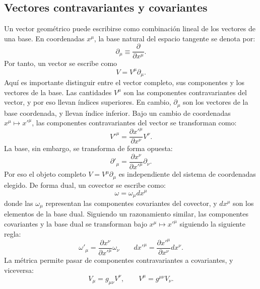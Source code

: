 \documentclass[a4paper,11pt]{book} %
\begin{document}
\subsection{Vectores contravariantes y covariantes}
\noindent
Un vector geométrico puede escribirse como combinación lineal de los vectores de una base. En coordenadas \(x^\mu\), la base natural del espacio tangente se denota por:
\begin{equation}
    \partial_\mu \equiv \frac{\partial}{\partial x^\mu}.
\end{equation}
Por tanto, un vector se escribe como
\begin{equation}
    V = V^\mu \partial_\mu.
\end{equation}
Aquí es importante distinguir entre el vector completo, sus componentes y los
vectores de la base. Las cantidades $V^\mu$ son las componentes contravariantes del vector, y por eso llevan índices superiores. En cambio, $\partial_\mu$ son los vectores de la base coordenada, y llevan índice inferior.
\medskip\newline
Bajo un cambio de coordenadas \(x^\mu \mapsto x'^\mu\), las componentes
contravariantes del vector se transforman como:
\begin{equation}
    V'^\mu
    =
    \frac{\partial x'^\mu}{\partial x^\nu} V^\nu.
\end{equation}
La base, sin embargo, se transforma de forma opuesta:
\begin{equation}
    \partial'_\mu
    =
    \frac{\partial x^\nu}{\partial x'^\mu}\partial_\nu.
\end{equation}
Por eso el objeto completo $V = V^\mu \partial_\mu$
es independiente del sistema de coordenadas elegido.
\medskip\newline
De forma dual, un covector se escribe como: $$\omega = \omega_\mu dx^\mu$$
donde las $\omega_\mu$ representan las componentes covariantes del covector, y $dx^\mu$ son los elementos de la base dual.
\medskip\newline
Siguiendo un razonamiento similar, las componentes covariantes y la base dual se transforman bajo \(x^\mu \mapsto x'^\mu\) siguiendo la siguiente regla:
\begin{equation}
    \omega'_\mu
    =
    \frac{\partial x^\nu}{\partial x'^\mu}\omega_\nu \qquad 
    dx'^\mu
    =
    \frac{\partial x'^\mu}{\partial x^\nu}dx^\nu.
\end{equation}
\newpage\noindent
La métrica permite pasar de componentes contravariantes a covariantes, y
viceversa:
\begin{equation}
    V_\mu = g_{\mu\nu}V^\nu,
    \qquad
    V^\mu = g^{\mu\nu}V_\nu.
\end{equation}
\end{document}
